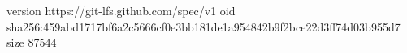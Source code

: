 version https://git-lfs.github.com/spec/v1
oid sha256:459abd1717bf6a2c5666cf0e3bb181de1a954842b9f2bce22d3ff74d03b955d7
size 87544

